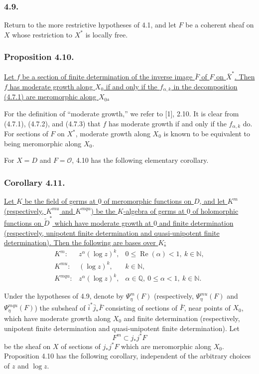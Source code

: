 \subsubsection*{4.9.}
Return to the more restrictive hypotheses of 4.1, and let $F$ be a
coherent sheaf on $X$ whose restriction to $X^*$ is locally free.

\subsubsection*{Proposition 4.10.}
\underline{Let $f$ be a section of finite determination of the inverse
image $\bar F$ of $F$ on $\bar X^*$.  Then $f$ has moderate growth
along $X_0$ if and only if the $f_{\alpha,k}$ in the decomposition
(4.7.1) are meromorphic along $X_0$.}

For the definition of ``moderate growth,'' we refer to [1], 2.10.  It
is clear from (4.7.1), (4.7.2), and (4.7.3) that $f$ has moderate
growth if and only if the $f_{\alpha,k}$ do.  For sections of $F$ on
$X^*$, moderate growth along $X_0$ is known to be equivalent to being
meromorphic along $X_0$.

For $X=D$ and $F=\mathcal O$, 4.10 has the following elementary
corollary.

\subsubsection*{Corollary 4.11.}
\underline{Let $K$ be the field of germs at $0$ of meromorphic
functions on $D$, and let $K^m$ (respectively, $K^{mu}$ and $K^{mqu}$)
be the $K$-algebra of germs at $0$ of holomorphic functions on
$\widetilde D^*$ which have moderate growth at $0$ and finite
determination (respectively, unipotent finite determination and
quasi-unipotent finite determination).  Then the following are bases
over $K$:}
\[
\begin{array}{lll}
K^m:&z^\alpha(\log z)^k,
  &0\leq\operatorname{Re}(\alpha)<1,\ k\in\mathbb N,\\[2pt]
K^{mu}:&(\log z)^k,&k\in\mathbb N,\\[2pt]
K^{mqu}:&z^\alpha(\log z)^k,
  &\alpha\in\mathbb Q,\ 0\leq\alpha<1,\ k\in\mathbb N.
\end{array}
\]

Under the hypotheses of 4.9, denote by $\Psi_\eta^m(F)$
(respectively, $\Psi_\eta^{mu}(F)$ and $\Psi_\eta^{mqu}(F)$) the
subsheaf of $\bar i^*\bar j_*\bar F$ consisting of sections of
$\bar F$, near points of $X_0$, which have moderate growth along
$X_0$ and finite determination (respectively, unipotent finite
determination and quasi-unipotent finite determination).  Let
\[
F^m\subset j_*j^*F
\]
be the sheaf on $X$ of sections of $j_*j^*F$ which are meromorphic
along $X_0$.  Proposition 4.10 has the following corollary, independent
of the arbitrary choices of $z$ and $\log z$.

